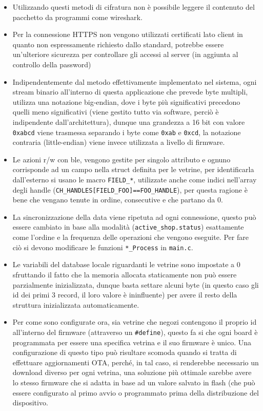 \begin{itemize}
  \item Utilizzando questi metodi di cifratura non \`e possibile leggere il contenuto del pacchetto da programmi come wireshark.
  \item Per la connessione HTTPS non vengono utilizzati certificati lato client in quanto non espressamente richiesto dallo standard, potrebbe essere un'ulteriore sicurezza per controllare gli accessi al server (in aggiunta al controllo della password)
  \item Indipendentemente dal metodo effettivamente implementato nel sistema, ogni stream binario all'interno di questa applicazione che prevede byte multipli, utilizza una notazione big-endian, dove i byte pi\`u significativi precedono quelli meno significativi (viene gestito tutto via software, perci\`o \`e indipendente dall'architettura), dunque una grandezza a 16 bit con valore \texttt{0xabcd} viene trasmessa separando i byte come \texttt{0xab} e \texttt{0xcd}, la notazione contraria (little-endian) viene invece utilizzata a livello di firmware.
  \item Le azioni r/w con ble, vengono gestite per singolo attributo e ognuno corrisponde ad un campo nella struct definita per le vetrine, per identificarla dall'esterno si usano le macro \texttt{FIELD\_*}, utilizzate anche come indici nell'array degli handle (\texttt{CH\_HANDLES[FIELD\_FOO]==FOO\_HANDLE}), per questa ragione \`e bene che vengano tenute in ordine, consecutive e che partano da 0.
  \item La sincronizzazione della data viene ripetuta ad ogni connessione, questo pu\`o essere cambiato in base alla modalit\`a (\texttt{active\_shop.status}) esattamente come l'ordine e la frequenza delle operazioni che vengono eseguite. Per fare ci\`o si devono modificare le funzioni \texttt{*\_Process} in \texttt{main.c}.
  \item Le variabili del database locale riguardanti le vetrine sono impostate a 0 sfruttando il fatto che la memoria allocata staticamente non pu\`o essere parzialmente inizializzata, dunque basta settare alcuni byte (in questo caso gli id dei primi 3 record, il loro valore \`e ininfluente) per avere il resto della struttura inizializzata automaticamente.
  \item Per come sono configurate ora, sia vetrine che negozi contengono il proprio id all'interno del firmware (attraverso un \texttt{\#define}), questo fa si che ogni board \`e programmata per essere una specifica vetrina e il suo firmware \`e unico. Una configurazione di questo tipo pu\`o risultare scomoda quando si tratta di effettuare aggiornamenti OTA, perch\'e, in tal caso, si renderebbe necessario un download diverso per ogni vetrina, una soluzione pi\`u ottimale sarebbe avere lo stesso firmware che si adatta in base ad un valore salvato in flash (che pu\`o essere configurato al primo avvio o programmato prima della distribuzione del dispositivo.

\end{itemize}
